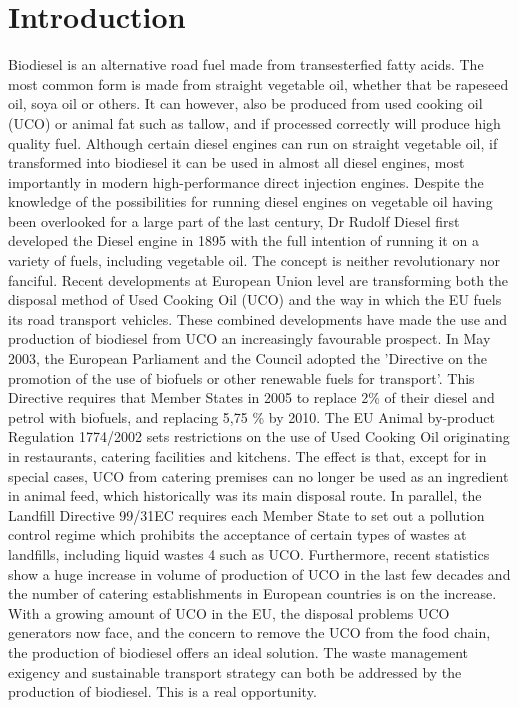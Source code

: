 \documentclass[11pt,fleqn]{book} %
\begin{document}
\section{Introduction}
Biodiesel is an alternative road fuel made from transesterfied fatty acids. The most common
form is made from straight vegetable oil, whether that be rapeseed oil, soya oil or others. It
can however, also be produced from used cooking oil (UCO) or animal fat such as tallow,
and if processed correctly will produce high quality fuel. Although certain diesel engines can
run on straight vegetable oil, if transformed into biodiesel it can be used in almost all diesel
engines, most importantly in modern high-performance direct injection engines.
Despite the knowledge of the possibilities for running diesel engines on vegetable oil having
been overlooked for a large part of the last century, Dr Rudolf Diesel first developed the
Diesel engine in 1895 with the full intention of running it on a variety of fuels, including
vegetable oil. The concept is neither revolutionary nor fanciful.
Recent developments at European Union level are transforming both the disposal method of
Used Cooking Oil (UCO) and the way in which the EU fuels its road transport vehicles.
These combined developments have made the use and production of biodiesel from UCO an
increasingly favourable prospect.
In May 2003, the European Parliament and the Council adopted the 'Directive on the
promotion of the use of biofuels or other renewable fuels for transport'. This Directive
requires that Member States in 2005 to replace 2\% of their diesel and petrol with biofuels,
and replacing 5,75 \% by 2010.
The EU Animal by-product Regulation 1774/2002 sets restrictions on the use of Used
Cooking Oil originating in restaurants, catering facilities and kitchens. The effect is that,
except for in special cases, UCO from catering premises can no longer be used as an
ingredient in animal feed, which historically was its main disposal route. In parallel, the
Landfill Directive 99/31EC requires each Member State to set out a pollution control regime
which prohibits the acceptance of certain types of wastes at landfills, including liquid wastes
4
such as UCO. Furthermore, recent statistics show a huge increase in volume of production of
UCO in the last few decades and the number of catering establishments in European
countries is on the increase.
With a growing amount of UCO in the EU, the disposal problems UCO generators now face,
and the concern to remove the UCO from the food chain, the production of biodiesel offers
an ideal solution. The waste management exigency and sustainable transport strategy can
both be addressed by the production of biodiesel. This is a real opportunity.
\end{document}
